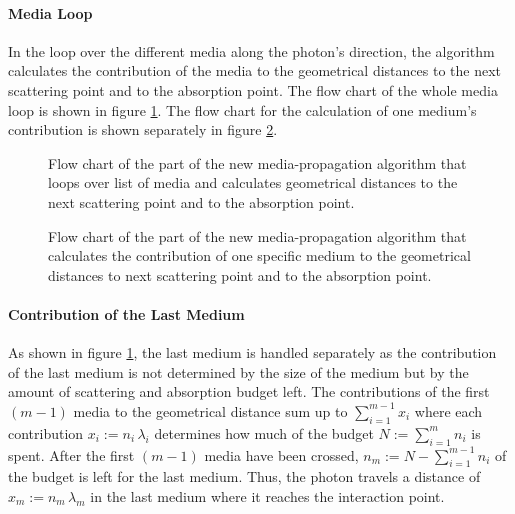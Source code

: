 \paragraph{Media Loop}

In the loop over the different media along the photon's direction, the
algorithm calculates the contribution of the media to the geometrical
distances to the next scattering point and to the absorption point. The
flow chart of the whole media loop is shown in figure
\ref{fig:nimuriX4}. The flow chart for the calculation of one medium's
contribution is shown separately in figure \ref{fig:eewoo3Be}.

\begin{figure}[p]
  \resizebox{\textwidth}{!}{%
    
  }
  \vspace*{5mm}
  \caption{Flow chart of the part of the new media-propagation algorithm that loops over list of media and calculates geometrical distances to the next scattering point and to the absorption point.}
  \label{fig:nimuriX4}
\end{figure}

\begin{figure}[htbp]
  \caption{Flow chart of the part of the new media-propagation algorithm that calculates the contribution of one specific medium to the geometrical distances to next scattering point and to the absorption point.}
  \label{fig:eewoo3Be}
\end{figure}

\paragraph{Contribution of the Last Medium}

As shown in figure \ref{fig:nimuriX4}, the last medium is handled
separately as the contribution of the last medium is not determined by
the size of the medium but by the amount of scattering and absorption
budget left. The contributions of the first \((m-1)\) media to the
geometrical distance sum up to \(\sum_{i=1}^{m-1} x_i\) where each
contribution \(x_i := n_i\,\lambda_i\) determines how much of the budget
\(N:=\sum_{i=1}^m n_i\) is spent. After the first \((m-1)\) media have
been crossed, \(n_m := N - \sum_{i=1}^{m-1} n_i\) of the budget is left
for the last medium. Thus, the photon travels a distance of
\(x_m := n_m\,\lambda_m\) in the last medium where it reaches the
interaction point.

